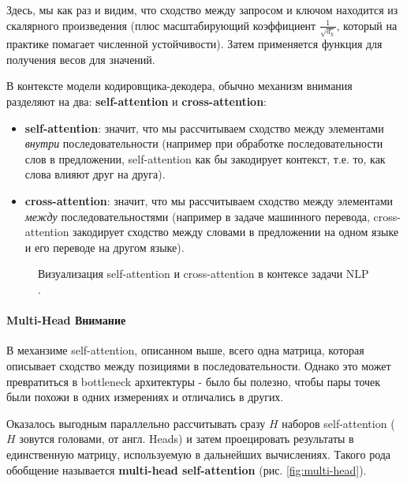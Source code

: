 Здесь, мы как раз и видим, что сходство между запросом и ключом находится из 
скалярного произведения (плюс масштабирующий коэффициент $\frac{1}{\sqrt{d_k}}$, 
который на практике помагает численной устойчивости). Затем применяется функция 
 для получения весов для значений.

В контексте модели кодировщика-декодера, обычно механизм внимания разделяют на 
два: \textbf{self-attention} и \textbf{cross-attention}:
\begin{itemize}
    \item \textbf{self-attention}: значит, что мы рассчитываем сходство между элементами 
    \textit{внутри} последовательности (например при обработке последовательности 
    слов в предложении, self-attention как бы закодирует контекст, т.е. то, как 
    слова влияют друг на друга).
    \item \textbf{cross-attention}: значит, что мы рассчитываем сходство между 
    элементами \textit{между} последовательностями (например в задаче машинного перевода, 
    cross-attention закодирует сходство между словами в предложении на одном языке и 
    его переводе на другом языке).
\end{itemize}

\begin{figure}[h!]
    \centering
    \caption{Визуализация self-attention и cross-attention в контексе задачи NLP \cite{3blue1brown_attention}.}
    \label{fig:selfXcross_attention}
\end{figure}

\paragraph{Multi-Head Внимание}

В механзиме self-attention, описанном выше, всего одна матрица, которая 
описывает сходство между позициями в последовательности. Однако это 
может превратиться в bottleneck архитектуры - было бы полезно, 
чтобы пары точек были похожи в одних измерениях и отличались в других. 

Оказалось выгодным параллельно рассчитывать сразу $H$ наборов self-attention 
($H$ зовутся головами, от англ. Heads) и затем проецировать результаты 
в единственную матрицу, используемую в дальнейших вычислениях. Такого рода 
обобщение называется \textbf{multi-head self-attention} \cite{turner_transformers_intro}
(рис. \ref{fig:multi-head}). \newpage

